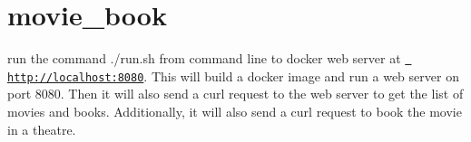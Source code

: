 \chapter{movie\+\_\+book}
\hypertarget{md__r_e_a_d_m_e}{}\label{md__r_e_a_d_m_e}
\label{md__r_e_a_d_m_e_autotoc_md0}%
%
 run the command {\ttfamily ./run.sh} from command line to docker web server at \href{http://localhost:8080}{\texttt{ http\+://localhost\+:8080}}. This will build a docker image and run a web server on port 8080. Then it will also send a curl request to the web server to get the list of movies and books. Additionally, it will also send a curl request to book the movie in a theatre. 